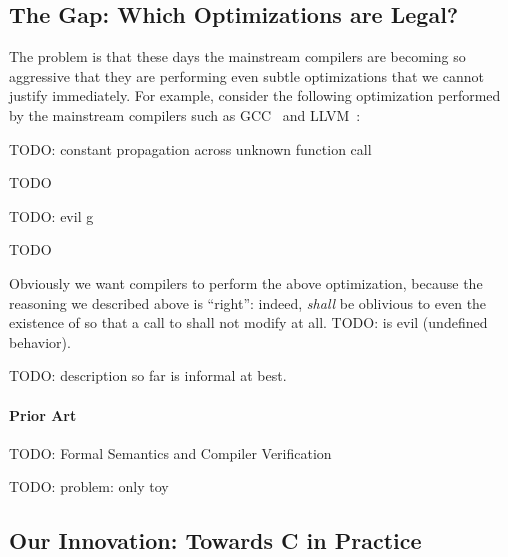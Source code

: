 


\subsection{The Gap: Which Optimizations are Legal?}

The problem is that these days the mainstream compilers are becoming so aggressive that they are
performing even subtle optimizations that we cannot justify immediately.  For example, consider the
following optimization performed by the mainstream compilers such as GCC~\cite{gcc} and
LLVM~\cite{llvm}:

TODO: constant propagation across unknown function call

\noindent TODO

TODO: evil g

\noindent TODO

Obviously we want compilers to perform the above optimization, because the reasoning we described
above is ``right'': indeed,  \emph{shall} be oblivious to even the existence of 
so that a call to  shall not modify  at all.  TODO:  is evil (undefined
behavior).

TODO: description so far is informal at best.


\paragraph{Prior Art}

TODO: Formal Semantics and Compiler Verification

TODO: problem: only toy


\subsection{Our Innovation: Towards C in Practice}

